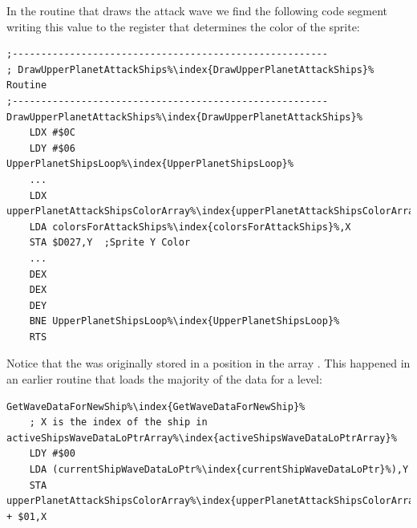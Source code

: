 In the routine that draws the attack wave we find the following code segment writing this value
to the register  that determines the color of the sprite:

\begin{lstlisting}[escapechar=\%]
;-------------------------------------------------------
; DrawUpperPlanetAttackShips%\index{DrawUpperPlanetAttackShips}% Routine
;-------------------------------------------------------
DrawUpperPlanetAttackShips%\index{DrawUpperPlanetAttackShips}%
    LDX #$0C
    LDY #$06
UpperPlanetShipsLoop%\index{UpperPlanetShipsLoop}%   
    ...
    LDX upperPlanetAttackShipsColorArray%\index{upperPlanetAttackShipsColorArray}%,Y
    LDA colorsForAttackShips%\index{colorsForAttackShips}%,X
    STA $D027,Y  ;Sprite Y Color
    ...
    DEX
    DEX
    DEY
    BNE UpperPlanetShipsLoop%\index{UpperPlanetShipsLoop}%
    RTS
\end{lstlisting}

Notice that the  was originally stored in a position in the array .
This happened in an earlier routine that loads the majority of the data for a level:


\begin{lstlisting}[escapechar=\%]
GetWaveDataForNewShip%\index{GetWaveDataForNewShip}%
    ; X is the index of the ship in activeShipsWaveDataLoPtrArray%\index{activeShipsWaveDataLoPtrArray}%
    LDY #$00
    LDA (currentShipWaveDataLoPtr%\index{currentShipWaveDataLoPtr}%),Y
    STA upperPlanetAttackShipsColorArray%\index{upperPlanetAttackShipsColorArray}% + $01,X
\end{lstlisting}

